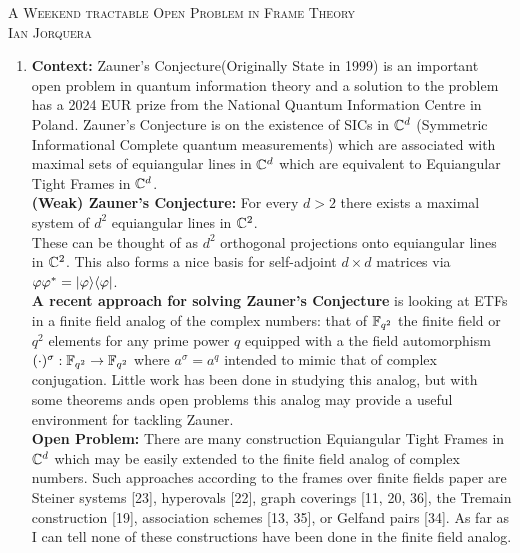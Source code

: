 \documentclass[12pt]{amsart}
\DeclarePairedDelimiter\bra{\langle}{\rvert}
\DeclarePairedDelimiter\ket{\lvert}{\rangle}
\begin{document}
\begin{center}
    \textsc{A Weekend tractable Open Problem in Frame Theory\\ Ian Jorquera}
\end{center}
\vspace{1em}

\begin{enumerate}
    \item \textbf{Context:} Zauner's Conjecture(Originally State in 1999) is 
    an important open problem in quantum information theory and a solution to the problem 
    has a 2024 EUR prize from the National Quantum Information Centre in Poland.
    Zauner's Conjecture is on the existence of SICs in $\mathbb{C}^d$ (Symmetric Informational 
    Complete quantum measurements) which are associated with maximal sets of equiangular 
    lines in $\mathbb{C}^d$ which are equivalent to Equiangular Tight Frames in $\mathbb{C}^d$.\\


    \noindent\textbf{(Weak) Zauner's Conjecture:} For every $d>2$ there exists a maximal system of 
    $d^2$ equiangular lines in $\mathbb{C}^2$. \\


    \noindent These can be thought of as $d^2$ orthogonal projections onto equiangular lines in $\mathbb{C}^2$.
    This also forms a nice basis for self-adjoint $d\times d$ matrices via $\phi\phi^*=\ket{\phi}\bra{\phi}$.\\


    \noindent\textbf{A recent approach for solving Zauner's Conjecture} is looking at 
    ETFs in a finite field analog of the complex numbers: that of $\mathbb{F}_{q^2}$ the finite 
    field or $q^2$ elements for any prime power $q$ equipped with a the field 
    automorphism $(\cdot)^\sigma:\mathbb{F}_{q^2}\rightarrow \mathbb{F}_{q^2}$ where $a^\sigma=a^q$ 
    intended to mimic that of complex conjugation. Little work has been done 
    in studying this analog, but with some theorems ands open problems this analog
    may provide a useful environment for tackling Zauner.\\


    \noindent\textbf{Open Problem:} There are many construction Equiangular Tight Frames in $\mathbb{C}^d$ which
    may be easily extended to the finite field analog of complex numbers.
    Such approaches according to the frames over finite fields paper are 
    Steiner systems [23], hyperovals [22], graph coverings [11, 20, 36], 
    the Tremain construction [19], association schemes [13, 35], or Gelfand pairs [34]. 
    As far as I can tell none of these constructions have been done in the finite field analog.


\end{enumerate}
\end{document}
